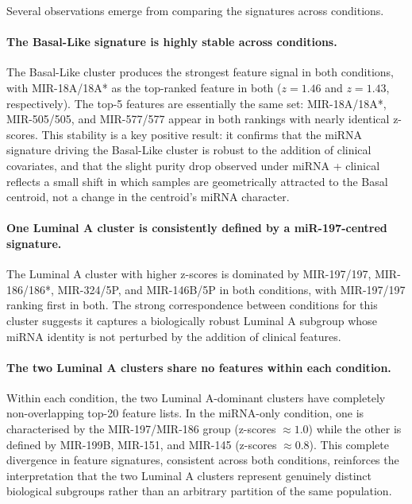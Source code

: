 Several observations emerge from comparing the signatures across conditions.

\paragraph{The Basal-Like signature is highly stable across conditions.}
The Basal-Like cluster produces the strongest feature signal in both conditions, with
MIR-18A/18A* as the top-ranked feature in both ($z = 1.46$ and $z = 1.43$,
respectively). The top-5 features are essentially the same set: MIR-18A/18A*,
MIR-505/505, and MIR-577/577 appear in both rankings with nearly identical z-scores.
This stability is a key positive result: it confirms that the miRNA signature driving
the Basal-Like cluster is robust to the addition of clinical covariates, and that the
slight purity drop observed under miRNA + clinical reflects a small shift in which
samples are geometrically attracted to the Basal centroid, not a change in the centroid's
miRNA character.

\paragraph{One Luminal A cluster is consistently defined by a miR-197-centred signature.}
The Luminal A cluster with higher z-scores is dominated by MIR-197/197, MIR-186/186*,
MIR-324/5P, and MIR-146B/5P in both conditions, with MIR-197/197 ranking first in both.
The strong
correspondence between conditions for this cluster suggests it captures a biologically
robust Luminal A subgroup whose miRNA identity is not perturbed by the addition of
clinical features.

\paragraph{The two Luminal A clusters share no features within each condition.}
Within each condition, the two Luminal A-dominant clusters have completely
non-overlapping top-20 feature lists. In the miRNA-only condition, one is characterised
by the MIR-197/MIR-186 group (z-scores $\approx 1.0$) while the other is defined by
MIR-199B, MIR-151, and MIR-145 (z-scores $\approx 0.8$). This complete divergence in
feature signatures, consistent across both conditions, reinforces the interpretation
that the two Luminal A clusters represent genuinely distinct biological subgroups rather
than an arbitrary partition of the same population.

